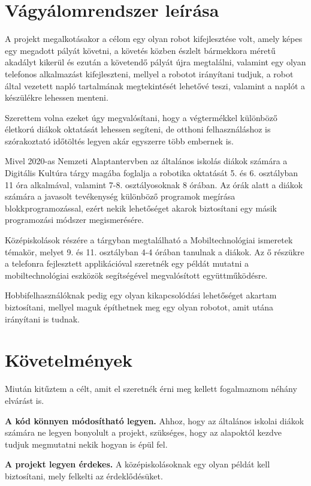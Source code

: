 \documentclass[]{thesis-ekf}
\theoremstyle{definition}
\begin{document}
\section{Vágyálomrendszer leírása}\label{vágyálom}
A projekt megalkotásakor a célom egy olyan robot kifejlesztése volt, amely képes egy megadott pályát követni, a követés közben észlelt bármekkora méretű akadályt kikerül és ezután a követendő pályát újra megtalálni, valamint egy olyan telefonos alkalmazást kifejleszteni, mellyel a robotot irányítani tudjuk, a robot által vezetett napló tartalmának megtekintését lehetővé teszi, valamint a naplót a készülékre lehessen menteni.

Szerettem volna ezeket úgy megvalósítani, hogy a végtermékkel különböző életkorú diákok oktatását lehessen segíteni, de otthoni felhasználáshoz is szórakoztató időtöltés legyen akár egyszerre több embernek is.

Mivel 2020-as Nemzeti Alaptantervben az általános iskolás diákok számára a Digitális Kultúra tárgy magába foglalja a robotika oktatását 5. és 6. osztályban 11 óra alkalmával, valamint 7-8. osztályosoknak 8 órában. Az órák alatt a diákok számára a javasolt tevékenység különböző programok megírása blokkprogramozással, ezért nekik lehetőséget akarok biztosítani egy másik programozási módszer megismerésére.

Középiskolások részére a tárgyban megtalálható a Mobiltechnológiai ismeretek témakör, melyet 9. és 11. osztályban 4-4 órában tanulnak a diákok. Az ő részükre a telefonra fejlesztett applikációval szeretnék egy példát mutatni a mobiltechnológiai eszközök segítségével megvalósított együttműködésre.

Hobbifelhasználóknak pedig egy olyan kikapcsolódási lehetőséget akartam biztosítani, mellyel maguk építhetnek meg egy olyan robotot, amit utána irányítani is tudnak.
\section{Követelmények}\label{követelmény}
Miután kitűztem a célt, amit el szeretnék érni meg kellett fogalmaznom néhány elvárást is.

\textbf{A kód könnyen módosítható legyen.} Ahhoz, hogy az általános iskolai diákok számára ne legyen bonyolult a projekt, szükséges, hogy az alapoktól kezdve tudjuk megmutatni nekik hogyan is épül fel.

\textbf{A projekt legyen érdekes.} A középiskolásoknak egy olyan példát kell biztosítani, mely felkelti az érdeklődésüket.
\end{document}

